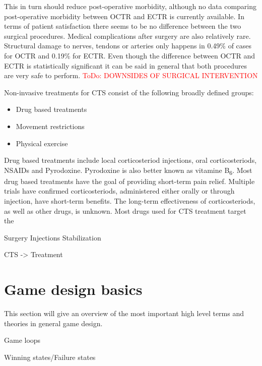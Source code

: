 This in turn should reduce post-operative morbidity\cite{scholten2007surgical}, although no data comparing post-operative morbidity between \gls{OCTR} and \gls{ECTR} is currently available.
In terms of patient satisfaction there seems to be no difference between the two surgical procedures\cite{atroshi2015extended}.
Medical complications after surgery are also relatively rare.
Structural damage to nerves, tendons or arteries only happens in 0.49\% of cases for \gls{OCTR} and 0.19\% for \gls{ECTR}\cite{benson2006complications}.
Even though the difference between \gls{OCTR} and \gls{ECTR} is statistically significant it can be said in general that both procedures are very safe to perform.
\textcolor{red}{ToDo: DOWNSIDES OF SURGICAL INTERVENTION}

Non-invasive treatments for \gls{CTS} consist of the following broadly defined groups:
\begin{itemize}
	\item Drug based treatments
	\item Movement restrictions
	\item Physical exercise
\end{itemize}

Drug based treatments include local corticosteriod injections, oral corticosteriods, \gls{NSAIDs} and Pyrodoxine.
Pyrodoxine is also better known as vitamine B\textsubscript{6}.
Most drug based treatments have the goal of providing short-term pain relief.
Multiple trials have confirmed corticosteriods, administered either orally or through injection, have short-term benefits\cite{van2007repetitive}.
The long-term effectiveness of corticosteriods, as well as other drugs, is unknown.
Most drugs used for \gls{CTS} treatment target the

Surgery
Injections
Stabilization

\gls{CTS} -> Treatment \cite{van2007repetitive}


\section{Game design basics}

This section will give an overview of the most important high level terms and theories in general game design.

Game loops

Winning states/Failure states

